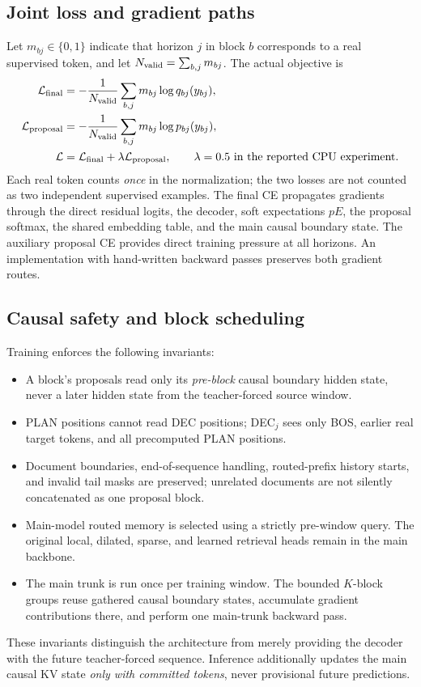 \documentclass[11pt,letterpaper]{article}
\begin{document}
\subsection{Joint loss and gradient paths}
Let $m_{bj}\in\{0,1\}$ indicate that horizon $j$ in block $b$ corresponds to a real supervised token, and let $N_{\rm valid}=\sum_{b,j}m_{bj}$. The actual objective is
\begin{align}
 \mathcal{L}_{\mathrm{final}}&=-\frac{1}{N_{\rm valid}}\sum_{b,j}m_{bj}\log q_{bj}(y_{bj}),\\
 \mathcal{L}_{\mathrm{proposal}}&=-\frac{1}{N_{\rm valid}}\sum_{b,j}m_{bj}\log p_{bj}(y_{bj}),\\
 \mathcal{L}&=\mathcal{L}_{\mathrm{final}}+\lambda\mathcal{L}_{\mathrm{proposal}},\qquad \lambda=0.5\text{ in the reported CPU experiment}.
 \label{eq:loss}
\end{align}
Each real token counts \emph{once} in the normalization; the two losses are not counted as two independent supervised examples. The final CE propagates gradients through the direct residual logits, the decoder, soft expectations $pE$, the proposal softmax, the shared embedding table, and the main causal boundary state. The auxiliary proposal CE provides direct training pressure at all horizons. An implementation with hand-written backward passes preserves both gradient routes.

\subsection{Causal safety and block scheduling}
Training enforces the following invariants:
\begin{itemize}
 \item A block's proposals read only its \emph{pre-block} causal boundary hidden state, never a later hidden state from the teacher-forced source window.
 \item PLAN positions cannot read DEC positions; DEC$_j$ sees only BOS, earlier real target tokens, and all precomputed PLAN positions.
 \item Document boundaries, end-of-sequence handling, routed-prefix history starts, and invalid tail masks are preserved; unrelated documents are not silently concatenated as one proposal block.
 \item Main-model routed memory is selected using a strictly pre-window query. The original local, dilated, sparse, and learned retrieval heads remain in the main backbone.
 \item The main trunk is run once per training window. The bounded $K$-block groups reuse gathered causal boundary states, accumulate gradient contributions there, and perform one main-trunk backward pass.
\end{itemize}
These invariants distinguish the architecture from merely providing the decoder with the future teacher-forced sequence. Inference additionally updates the main causal KV state \emph{only with committed tokens}, never provisional future predictions.
\end{document}
